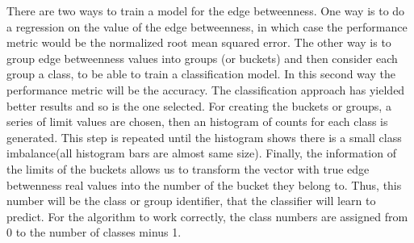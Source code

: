 There are two ways to train a model for the edge betweenness. One way is to do a regression on the value of the edge betweenness, in which case the performance metric would be the normalized root mean squared error. The other way is to group edge betweenness values into groups (or buckets) and then consider each group a class, to be able to train a classification model. In this second way the performance metric will be the accuracy. The classification approach has yielded better results and so is the one selected. For creating the buckets or groups, a series of limit values are chosen, then an histogram of counts for each class is generated. This step is repeated until the histogram shows there is a small class imbalance(all histogram bars are almost same size). Finally, the information of the limits of the buckets allows us to transform the vector with true edge betwenness real values into the number of the bucket they belong to. Thus, this number will be the class or group identifier, that the classifier will learn to predict. For the algorithm to work correctly, the class numbers are assigned from 0 to the number of classes minus 1.





